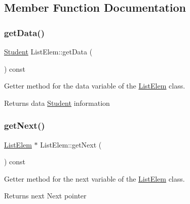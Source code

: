 \subsection{Member Function Documentation}
\mbox{\label{class_list_elem_af80ce8c80d9e4dfa450d9272c965e110}} 
\subsubsection{\texorpdfstring{get\+Data()}{getData()}}
{\footnotesize\ttfamily \hyperlink{class_student}{Student} List\+Elem\+::get\+Data (\begin{DoxyParamCaption}{ }\end{DoxyParamCaption}) const}



Getter method for the \textquotesingle{}data\textquotesingle{} variable of the \hyperlink{class_list_elem}{List\+Elem} class. 

\begin{DoxyReturn}{Returns}
data \hyperlink{class_student}{Student} information 
\end{DoxyReturn}
\mbox{\label{class_list_elem_ac615618c96d2bacc597ba59a4e8e2620}} 
\subsubsection{\texorpdfstring{get\+Next()}{getNext()}}
{\footnotesize\ttfamily \hyperlink{class_list_elem}{List\+Elem} $\ast$ List\+Elem\+::get\+Next (\begin{DoxyParamCaption}{ }\end{DoxyParamCaption}) const}



Getter method for the \textquotesingle{}next\textquotesingle{} variable of the \hyperlink{class_list_elem}{List\+Elem} class. 

\begin{DoxyReturn}{Returns}
next Next pointer 
\end{DoxyReturn}
\mbox{\label{class_list_elem_a2eece4a9fa40234ee6529c0b50480694}} 
